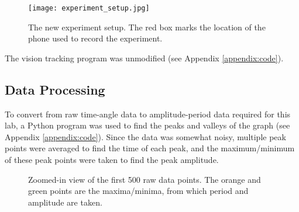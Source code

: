 \documentclass[aps,twocolumn,secnumarabic,nobalancelastpage,amsmath,amssymb,nofootinbib]{revtex4}
\begin{document}
\begin{figure}[htb]
    \texttt{[image: experiment\_setup.jpg]}
    \caption{The new experiment setup. The red box marks the location of the phone used to record the experiment.}
\end{figure}

The vision tracking program was unmodified (see Appendix \ref{appendix:code}).

\subsection{Data Processing}

To convert from raw time-angle data to amplitude-period data required for this lab, a Python program was used to find
the peaks and valleys of the graph (see Appendix \ref{appendix:code}). Since the data was somewhat noisy, multiple peak
points were averaged to find the time of each peak, and the maximum/minimum of these peak points were taken to find the
peak amplitude.

\begin{figure}[htb]
    \caption{Zoomed-in view of the first 500 raw data points. The orange and green points are the maxima/minima, from
             which period and amplitude are taken.}
\end{figure}
\end{document}

